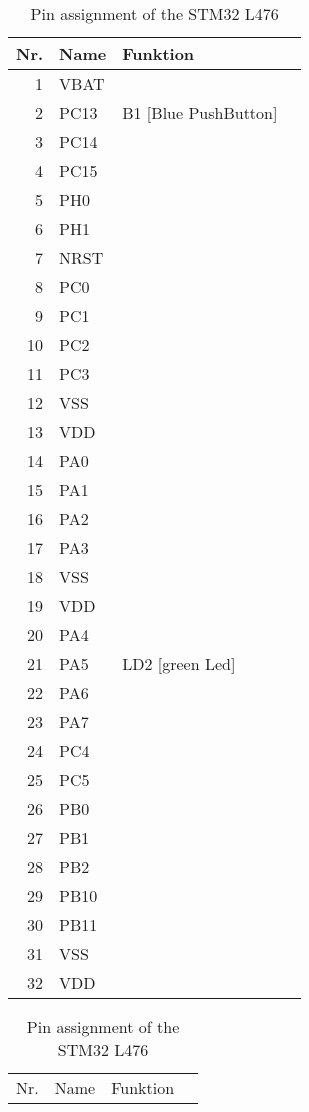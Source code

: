 \documentclass[12pt,fleqn,parskip=half,twoside,toc=index,headings=small,a4paper]{scrreprt}
\begin{document}
\begin{table}[H]
	\caption{Pin assignment of the STM32 L476}
	\renewcommand{\arraystretch}{1.0}
	\centering
	\begin{minipage}{.48\linewidth}
		\begin{tabularx}{\linewidth}{@{}rllX@{}}
			\toprule
			Nr. & Name & Funktion \\
			\midrule
			1 	& VBAT\\
			2 	& PC13 & B1 [Blue PushButton]\\
			3 	& PC14 \\
			4 	& PC15 \\
			5 	& PH0 \\
			6 	& PH1 \\
			7 	& NRST & \\
			8 	& PC0 & \\
			9 	& PC1 & \\ 
			10	& PC2 & \\
			11	& PC3 & \\
			12  & VSS & \\
			13  & VDD & \\
			14  & PA0 & \\
			15  & PA1 & \\
			16  & PA2 & \\ 
			\midrule
			17  & PA3  & \\
			18  & VSS \\ 
			19  & VDD & \\ 
			20  & PA4 & \\ 
			21  & PA5 & LD2 [green Led] \\ 
			22  & PA6 \\ 
			23  & PA7 & \\
			24  & PC4 & \\ 
			25  & PC5 & \\ 
			26  & PB0  & \\ 
			27  & PB1 \\ 
			28  & PB2\\ 
			29  & PB10 & \\
			30  & PB11 & \\
			31  & VSS & \\
			32  & VDD & \\			
			\bottomrule
		\end{tabularx}
	\end{minipage}%
	\hfill
	\begin{minipage}{.48\linewidth}
		\begin{tabularx}{\linewidth}{@{}rllX@{}}
			\toprule
			Nr. & Name & Funktion \\

\end{tabularx}
\end{minipage}
\end{table}
\end{document}
